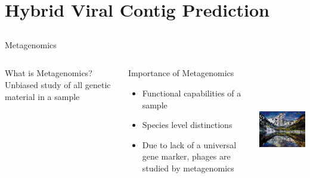\documentclass[11pt, xcolor=table]{beamer}
\begin{document}
	
\section{Hybrid Viral Contig Prediction}
\subsection{}

  \begin{frame}{Metagenomics}
	\begin{columns}
	\begin{block}{What is Metagenomics?}
	Unbiased study of all genetic material in a sample
	\end{block}
	\begin{block}{Importance of Metagenomics}
	\begin{itemize}
	\item Functional capabilities of a sample
	\item Species level distinctions
	\item Due to lack of a universal gene marker, phages are studied by metagenomics
	\end{itemize}
	\end{block}
	
	\includegraphics[height=5.5cm, width=5cm]{mosaic.png}
	\end{columns}
	\end{frame}
\end{document}
